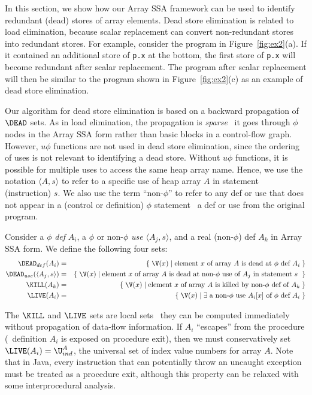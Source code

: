 In this section, we show how our Array SSA framework can be used to
identify redundant (dead) stores of array elements.  Dead store
elimination is related to load elimination, because scalar
replacement can convert non-redundant stores into redundant stores.
For example, consider the program in
Figure~\ref{fig:ex2}(a).  If it contained an additional
store of {\tt p.x} at the bottom, the first store of {\tt p.x} will
become redundant after scalar replacement.  The program after scalar
replacement will then be similar to the program shown in
Figure~\ref{fig:ex2}(c) as an example of dead
store elimination.

Our algorithm for dead store elimination is based on a backward
propagation of $\DEAD$ sets.  As in load elimination,
the propagation is {\it sparse} \ie\ it goes through $\phi$ nodes in
the Array SSA form rather than basic blocks in a control-flow graph.
However, $u\phi$ functions are not used in
dead store elimination, since the ordering of uses is not relevant
to identifying a dead store.
Without $u\phi$ functions, it is possible for
multiple uses to access the same heap array name.
Hence, we use the notation $\langle A,s \rangle$
to refer to a specific use of
heap array $A$ in statement (instruction) $s$.
We also
use the term ``non-$\phi$'' to refer to any def or use that does not
appear in a (control or definition)
$\phi$ statement \ie\ a def or use from the original program.

Consider a $\phi$ {\it def} $A_i$, a $\phi$ or non-$\phi$ {\it use} $\langle A_j, s \rangle$, and a real
(non-$\phi$) def $A_k$ in Array SSA form.  We define the following
four sets:
\begin{eqnarray*}
\DEAD_{def}(A_i) & = & \{\; \V(x) \; | \; 
\mbox{element $x$ of array $A$ is dead at $\phi$ def $A_i$} \;\} \\
\DEAD_{use}(\langle A_j,s \rangle) & = & \{\; \V(x) \; | \; 
\mbox{element $x$ of array $A$ is dead at non-$\phi$ use of $A_j$ in statement $s$ } \;\} \\
\KILL(A_k) & = & \{\; \V(x) \;|\; \mbox{element $x$ of array $A$ is killed by
non-$\phi$ def of $A_k$} \;\}\\
\LIVE(A_i) & = & \{ \; \V(x) \;| \; \exists \; \mbox{a non-$\phi$ use $A_i[x]$ of
$\phi$ def $A_i$}\;\}
\end{eqnarray*}

The $\KILL$ and $\LIVE$ sets are local sets \ie\ they can be computed 
immediately
without propagation of data-flow information.
If $A_i$ ``escapes'' from the procedure (\ie\ definition
$A_i$ is exposed on procedure exit), then we must conservatively
set $\LIVE(A_i) = \U^A_{ind}$, the universal set of index value numbers
for array $A$.  Note that in Java, every instruction that can potentially
throw an uncaught exception must be treated as a procedure exit, although this
property can be relaxed with some interprocedural analysis.

